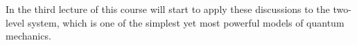 In the third lecture of this course will start to apply these discussions to the two-level system, which is one of the simplest yet most powerful models of quantum mechanics.